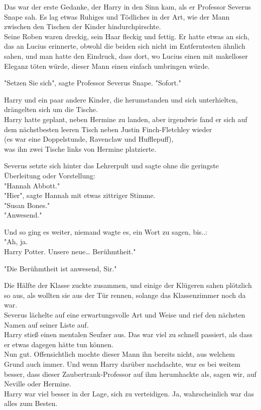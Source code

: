 {Das war der erste Gedanke, der Harry in den Sinn kam, als er Professor Severus Snape sah. Es lag etwas Ruhiges und Tödliches in der Art, wie der Mann zwischen den Tischen der Kinder hindurchpirschte.\\ Seine Roben waren dreckig, sein Haar fleckig und fettig. Er hatte etwas an sich, das an Lucius erinnerte, obwohl die beiden sich nicht im Entferntesten ähnlich sahen, und man hatte den Eindruck, dass dort, wo Lucius einen mit makelloser Eleganz töten würde, dieser Mann einen einfach umbringen würde.

"Setzen Sie sich", sagte Professor Severus Snape. "Sofort."

Harry und ein paar andere Kinder, die herumstanden und sich unterhielten, drängelten sich um die Tische.\\ Harry hatte geplant, neben Hermine zu landen, aber irgendwie fand er sich auf dem nächstbesten leeren Tisch neben Justin Finch-Fletchley wieder\\ (es war eine Doppelstunde, Ravenclaw und Hufflepuff),\\ was ihn zwei Tische links von Hermine platzierte.

Severus setzte sich hinter das Lehrerpult und sagte ohne die geringste Überleitung oder Vorstellung:\\ "Hannah Abbott."\\ "Hier", sagte Hannah mit etwas zittriger Stimme.\\ "Susan Bones."\\ "Anwesend."

Und so ging es weiter, niemand wagte es, ein Wort zu sagen, bis..:\\ "Ah, ja.\\ Harry Potter. Unsere neue… Berühmtheit."

"Die Berühmtheit ist anwesend, Sir."

Die Hälfte der Klasse zuckte zusammen, und einige der Klügeren sahen plötzlich so aus, als wollten sie aus der Tür rennen, solange das Klassenzimmer noch da war.\\ Severus lächelte auf eine erwartungsvolle Art und Weise und rief den nächsten Namen auf seiner Liste auf.\\ Harry stieß einen mentalen Seufzer aus. Das war viel zu schnell passiert, als dass er etwas dagegen hätte tun können.\\ Nun gut. Offensichtlich mochte dieser Mann ihn bereits nicht, aus welchem Grund auch immer. Und wenn Harry darüber nachdachte, war es bei weitem besser, dass dieser Zaubertrank-Professor auf ihm herumhackte als, sagen wir, auf Neville oder Hermine.\\ Harry war viel besser in der Lage, sich zu verteidigen. Ja, wahrscheinlich war das alles zum Besten.

}
